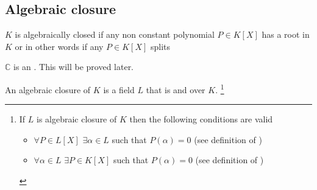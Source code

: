\begin{example}[$x^3-2$ over $\mathbb{Q}$]
\end{example}

\subsection{Algebraic closure}

\begin{definition}
  $K$ is algebraically closed if any non constant polynomial $P \in
  K\left[X\right]$ has a root in $K$ or in other words if any $P \in
  K\left[X\right]$ splits
  \label{def:algebraicallyclosed}
\end{definition}

\begin{example}[$\mathbb{C}$]
  $\mathbb{C}$ is an . This will be
  proved later.
\end{example}

\begin{definition}
  An algebraic closure of $K$ is a field $L$ that is
   and
  over $K$.
  \footnote{
    If $L$ is algebraic closure of $K$ then the following conditions
    are valid
    \begin{itemize}
      \item $\forall P \in L\left[ X \right]$ $\exists \alpha \in L$
        such that $P\left(\alpha\right) = 0$ (see definition of
        )
      \item $\forall \alpha \in L$ $\exists P \in K\left[ X \right]$
        such that $P\left(\alpha\right) = 0$ (see definition of
        )
    \end{itemize}
  }
  \label{def:algebraicclosure}
\end{definition}

